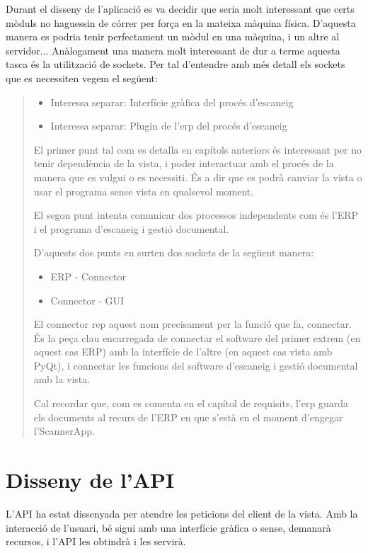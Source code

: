 \documentclass[letterpaper,11pt,catalan]{sphinxmanual}
\begin{document}
Durant el disseny de l'aplicació es va decidir que seria molt interessant que certs mòduls
no haguessin de córrer per força en la mateixa màquina física. D'aquesta manera es podria
tenir perfectament un mòdul en una màquina, i un altre al servidor...
Anàlogament una manera molt interessant de dur a terme aquesta tasca és la utilització
de sockets. Per tal d'entendre amb més detall els sockets que es necessiten vegem el següent:
\begin{quote}
\begin{itemize}
\item {} 
Interessa separar: Interfície gràfica del procés d'escaneig

\item {} 
Interessa separar: Plugin de l'erp del procés d'escaneig

\end{itemize}

El primer punt tal com es detalla en capítols anteriors és interessant per no tenir
dependència de la vista, i poder interactuar amb el procés de la manera que es vulgui
o es necessiti. És a dir que es podrà canviar la vista o usar el programa sense vista
en qualsevol moment.

El segon punt intenta comunicar dos processos independents com és l'ERP i el programa
d'escaneig i gestió documental.

D'aquests dos punts en surten dos sockets de la següent manera:
\begin{itemize}
\item {} 
ERP - Connector

\item {} 
Connector - GUI

\end{itemize}

El connector rep aquest nom precisament per la funció que fa, connectar. És la peça clau
encarregada de connectar el software del primer extrem (en aquest cas ERP) amb la interfície
de l'altre (en aquest cas vista amb PyQt), i connectar les funcions del software d'escaneig
i gestió documental amb la vista.

Cal recordar que, com es comenta en el capítol de requisits, l'erp guarda els documents al recurs de l'ERP en que
s'està en el moment d'engegar l'ScannerApp.
\end{quote}


\section{Disseny de l'API}
\label{\detokenize{index:disseny-de-l-api}}
L'API ha estat dissenyada per atendre les peticions del client de la vista.
Amb la interacció de l'usuari, bé sigui amb una interfície gràfica o sense, demanarà recursos, i l'API les obtindrà i les servirà.
\end{document}
